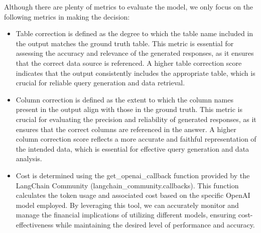     Although there are plenty of metrics to evaluate the model, we only focus on the following metrics in making the decision:
    \begin{itemize}
        \item Table correction is defined as the degree to which the table name included in the output matches the ground truth table. This metric is essential for assessing the accuracy and relevance of the generated responses, as it ensures that the correct data source is referenced. A higher table correction score indicates that the output consistently includes the appropriate table, which is crucial for reliable query generation and data retrieval.
        \item Column correction is defined as the extent to which the column names present in the output align with those in the ground truth. This metric is crucial for evaluating the precision and reliability of generated responses, as it ensures that the correct columns are referenced in the answer. A higher column correction score reflects a more accurate and faithful representation of the intended data, which is essential for effective query generation and data analysis.
        \item Cost is determined using the get\_openai\_callback function provided by the LangChain Community (langchain\_community.callbacks). This function calculates the token usage and associated cost based on the specific OpenAI model employed. By leveraging this tool, we can accurately monitor and manage the financial implications of utilizing different models, ensuring cost-effectiveness while maintaining the desired level of performance and accuracy.
    \end{itemize}

